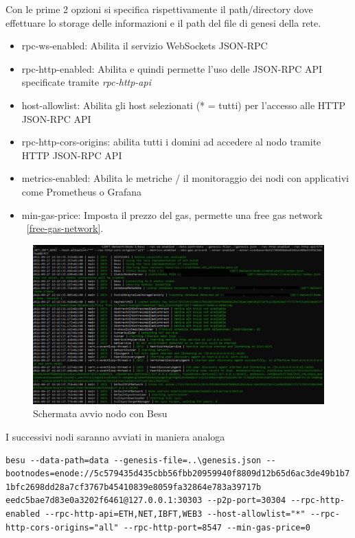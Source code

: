 \documentclass[11pt,a4paper,titlepage]{report}
\begin{document}
Con le prime 2 opzioni si specifica rispettivamente il path/directory dove effettuare lo storage delle informazioni e il path del file di genesi della rete. 
\begin{itemize}
\item rpc-ws-enabled: Abilita il servizio WebSockets JSON-RPC
\item rpc-http-enabled: Abilita e quindi permette l'uso delle JSON-RPC API specificate tramite \textit{rpc-http-api}
\item host-allowlist: Abilita gli host selezionati (* = tutti) per l'accesso alle HTTP JSON-RPC API
\item rpc-http-cors-origins: abilita tutti i domini ad accedere al nodo tramite HTTP JSON-RPC API
\item metrics-enabled: Abilita le metriche / il monitoraggio dei nodi con applicativi come Prometheus o Grafana
\item min-gas-price: Imposta il prezzo del gas, permette una free gas network ~\ref{free-gas-network}.
\end{itemize}

\begin{figure}[h]
	\includegraphics[width=\textwidth]{Besu-avvio}
	\centering
	\caption{Schermata avvio nodo con Besu}
	\label{fig:sch-avvio-besu}
\end{figure}

I successivi nodi saranno avviati in maniera analoga
\begin{lstlisting}[language=command.com]
besu --data-path=data --genesis-file=..\genesis.json --bootnodes=enode://5c579435d435cbb56fbb20959940f8809d12b65d6ac3de49b1b7 1bfc2698dd28a7cf3767b45410839e8059fa32864e783a39717b eedc5bae7d83e0a3202f6461@127.0.0.1:30303 --p2p-port=30304 --rpc-http-enabled --rpc-http-api=ETH,NET,IBFT,WEB3 --host-allowlist="*" --rpc-http-cors-origins="all" --rpc-http-port=8547 --min-gas-price=0
\end{lstlisting}
\end{document}
